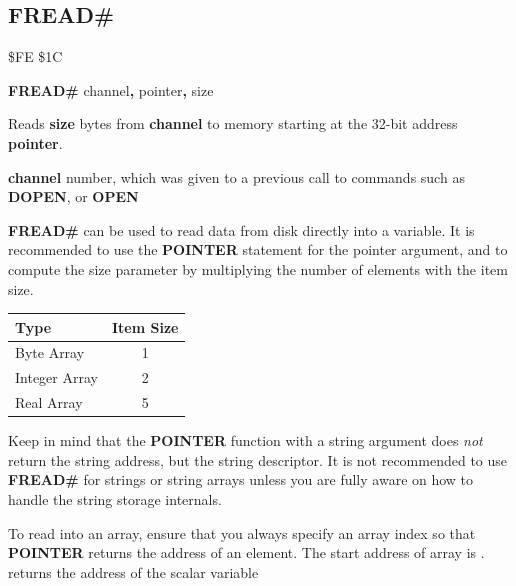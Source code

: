 \subsection{FREAD\#}
\begin{description}[leftmargin=2cm,style=nextline]
\item [Token:]    \$FE \$1C
\item [Format:]   {\bf FREAD\#} channel{\bf,} pointer{\bf,} size
\item [Usage:]    Reads {\bf size} bytes from {\bf channel} to memory starting at the 32-bit address {\bf pointer}.

                  {\bf channel} number, which was given to a previous call to commands such as {\bf DOPEN}, or {\bf OPEN}

                  {\bf FREAD\#} can be used to read data from disk directly into a variable. It is recommended to use the {\bf POINTER} statement for the pointer argument, and to compute the size parameter by multiplying the number of elements with the item size.

                  \begin{center}
                  \label{freadtable}
                  \setlength{\tabcolsep}{1mm}
                  \begin{tabular}{|l|c|}
                  \hline
                  {\bf Type}     & {\bf Item Size} \\
                  \hline
                  Byte     Array &  1  \\
                  Integer  Array &  2  \\
                  Real     Array &  5  \\
                  \hline
                  \end{tabular}
                  \end{center}

\item [Remarks:]  Keep in mind that the {\bf POINTER} function with a string argument does {\em not} return the string address, but the string descriptor. It is not recommended to use {\bf FREAD\#} for strings or string arrays unless you are fully aware on how to handle the string storage internals.

                  To read into an array, ensure that you always specify an array index so that {\bf POINTER} returns the address of an element. The start address of array  is .  returns the address of the scalar variable 


\end{description}
